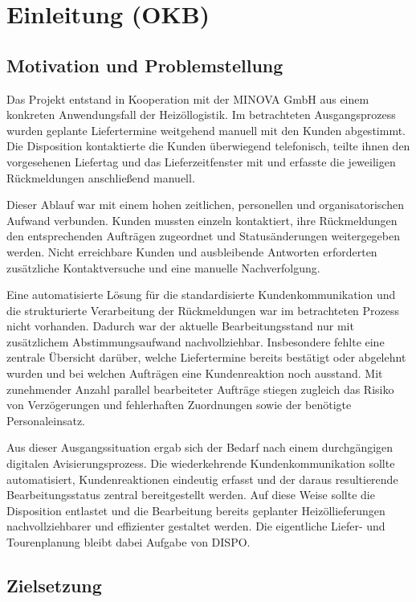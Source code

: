 \section{Einleitung (OKB)}

\subsection{Motivation und Problemstellung}

Das Projekt entstand in Kooperation mit der MINOVA GmbH aus
einem konkreten Anwendungsfall der Heizöllogistik. Im
betrachteten Ausgangsprozess wurden geplante Liefertermine
weitgehend manuell mit den Kunden abgestimmt. Die Disposition
kontaktierte die Kunden überwiegend telefonisch, teilte ihnen
den vorgesehenen Liefertag und das Lieferzeitfenster mit und
erfasste die jeweiligen Rückmeldungen anschließend manuell.

Dieser Ablauf war mit einem hohen zeitlichen, personellen und
organisatorischen Aufwand verbunden. Kunden mussten einzeln
kontaktiert, ihre Rückmeldungen den entsprechenden Aufträgen
zugeordnet und Statusänderungen weitergegeben werden. Nicht
erreichbare Kunden und ausbleibende Antworten erforderten
zusätzliche Kontaktversuche und eine manuelle Nachverfolgung.

Eine automatisierte Lösung für die standardisierte
Kundenkommunikation und die strukturierte Verarbeitung der
Rückmeldungen war im betrachteten Prozess nicht vorhanden.
Dadurch war der aktuelle Bearbeitungsstand nur mit zusätzlichem
Abstimmungsaufwand nachvollziehbar. Insbesondere fehlte eine
zentrale Übersicht darüber, welche Liefertermine bereits
bestätigt oder abgelehnt wurden und bei welchen Aufträgen eine
Kundenreaktion noch ausstand. Mit zunehmender Anzahl parallel
bearbeiteter Aufträge stiegen zugleich das Risiko von
Verzögerungen und fehlerhaften Zuordnungen sowie der benötigte
Personaleinsatz.

Aus dieser Ausgangssituation ergab sich der Bedarf nach einem
durchgängigen digitalen Avisierungsprozess. Die wiederkehrende
Kundenkommunikation sollte automatisiert, Kundenreaktionen
eindeutig erfasst und der daraus resultierende
Bearbeitungsstatus zentral bereitgestellt werden. Auf diese
Weise sollte die Disposition entlastet und die Bearbeitung
bereits geplanter Heizöllieferungen nachvollziehbarer und
effizienter gestaltet werden. Die eigentliche Liefer- und
Tourenplanung bleibt dabei Aufgabe von DISPO.

\subsection{Zielsetzung}

